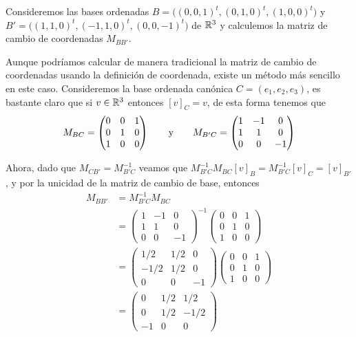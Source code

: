\begin{example}
  Consideremos las bases ordenadas $B = \bigl( (0,0,1)^t, (0,1,0)^t, (1,0,0)^t \bigr)$ y $B' = \bigl( (1,1,0)^t, (-1, 1, 0)^t, (0,0,-1)^t \bigr)$ de $\mathbb{R}^3$ y calculemos la matriz de cambio de coordenadas $M_{BB'}$.

  \examplesolution
  
  Aunque podríamos calcular de manera tradicional la matriz de cambio de coordenadas usando la definición de coordenada, existe un método más sencillo en este caso. Consideremos la base ordenada canónica $C = (e_1, e_2, e_3)$, es bastante claro que si $v \in \mathbb{R}^3$ entonces $[v]_C = v$, de esta forma tenemos que
  \[
    M_{BC} = \begin{pmatrix}
      0 & 0 & 1 \\
      0 & 1 & 0 \\
      1 & 0 & 0
    \end{pmatrix} \qquad\text{y}\qquad
    M_{B'C} = \begin{pmatrix}
      1 & -1 & 0 \\
      1 & 1  & 0 \\
      0 & 0  & -1
    \end{pmatrix}
  \]

  Ahora, dado que $M_{CB'} = M_{B'C}^{-1}$ veamos que $M_{B'C}^{-1} M_{BC}[v]_B = M_{B'C}^{-1}[v]_C = [v]_{B'}$, y por la unicidad de la matriz de cambio de base, entonces
  \begin{align*}
    M_{BB'} &= M_{B'C}^{-1} M_{BC} \\
      &= \begin{pmatrix}
        1 & -1 & 0 \\
        1 & 1  & 0 \\
        0 & 0  & -1
        \end{pmatrix}^{-1}
        \begin{pmatrix}
        0 & 0 & 1 \\
        0 & 1 & 0 \\
        1 & 0 & 0
        \end{pmatrix}  \\
      &= \begin{pmatrix}
        1/2  & 1/2 & 0 \\
        -1/2 & 1/2 & 0 \\
        0    & 0   & -1
        \end{pmatrix}
        \begin{pmatrix}
        0 & 0 & 1 \\
        0 & 1 & 0 \\
        1 & 0 & 0
        \end{pmatrix} \\
      &= \begin{pmatrix}
        0 & 1/2  & 1/2  \\
        0 & 1/2  & -1/2 \\
        -1 & 0    & 0
        \end{pmatrix}
  \end{align*}
\end{example}



